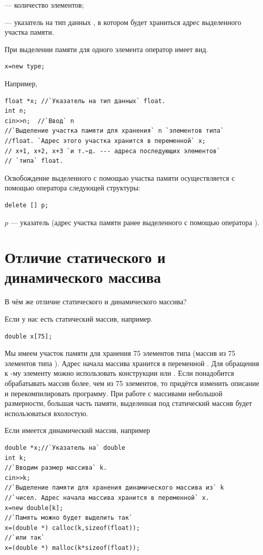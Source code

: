  --- количество элементов;

 --- указатель на тип данных , в котором будет храниться адрес выделенного
участка памяти.

При выделении памяти для одного элемента оператор  имеет вид.
\begin{lstlisting}
x=new type;
\end{lstlisting}
Например,
\begin{lstlisting}
float *x; //`Указатель на тип данных` float.
int n;
cin>>n;  //`Ввод` n 
//`Выделение участка памяти для хранения` n `элементов типа`
//float. `Адрес этого участка хранится в переменной` x;
// x+1, x+2, x+3 `и т.~д. --- адреса последующих элементов`
// `типа` float.
\end{lstlisting}
Освобождение выделенного с помощью  участка памяти осуществляется  с помощью оператора
 следующей структуры:
\begin{lstlisting}
delete [] p;
\end{lstlisting}
$p$ --- указатель (адрес участка памяти ранее выделенного с помощью оператора ).

\section[Отличие статического и динамического массива]{Отличие статического и динамического массива}
В чём же отличие статического и динамического массива?

Если у нас есть статический массив, например.
\begin{lstlisting}
double x[75];
\end{lstlisting}
Мы имеем участок памяти для хранения 75 элементов типа  (массив из 75 элементов типа
). Адрес начала массива хранится в переменной . Для обращения к
-му элементу можно использовать конструкции  или
. Если понадобится обрабатывать массив более, чем из 75 элементов, то придётся изменить
описание и перекомпилировать программу. При работе с массивами небольшой размерности, большая часть памяти, выделенная
под статический массив будет использоваться вхолостую.

Если имеется динамический массив, например
\begin{lstlisting}
double *x;//`Указатель на` double
int k;
//`Вводим размер массива` k.
cin>>k;
//`Выделение памяти для хранения динамического массива из` k
//`чисел. Адрес начала массива хранится в переменной` x.
x=new double[k];
//`Память можно будет выделить так`
x=(double *) calloc(k,sizeof(float));
//`или так`
x=(double *) malloc(k*sizeof(float));
\end{lstlisting}


